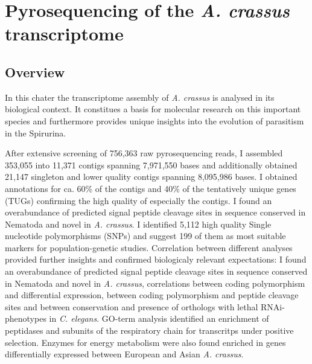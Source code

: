 
\chapter{Pyrosequencing of the \textit{A. crassus}
  transcriptome} %
\label{cha:pyro}



\ifpdf
    \graphicspath{{5_pyro/figures/PNG/}{5_pyro/figures/PDF/}{5_pyro/figures/}}
\else
    \graphicspath{{5_pyro/figures/EPS/}{5_pyro/figures/}}
\fi


\section{Overview}
\label{sec:454-overv}

In this chater the transcriptome assembly of \textit{A. crassus} is
analysed in its biological context. It constitues a basis for
molecular research on this important species and furthermore provides
unique insights into the evolution of parasitism in the Spirurina.

After extensive screening of 756,363 raw pyrosequencing reads, I
assembled 353,055 into 11,371 contigs spanning 7,971,550 bases and
additionally obtained 21,147 singleton and lower quality contigs
spanning 8,095,986 bases. I obtained annotations for ca. 60\% of the
contigs and 40\% of the tentatively unique genes (TUGs) confirming the
high quality of especially the contigs. I found an overabundance of
predicted signal peptide cleavage sites in sequence conserved in
Nematoda and novel in \textit{A. crassus}. I identified 5,112 high
quality Single nucleotide polymorphisms (SNPs) and suggest 199 of them
as most suitable markers for population-genetic studies. Correlation
between different analyses provided further insights and confirmed
biologicaly relevant expectations: I found an overabundance of
predicted signal peptide cleavage sites in sequence conserved in
Nematoda and novel in \textit{A. crassus}, correlations between coding
polymorphism and differential expression, between coding polymorphism
and peptide cleavage sites and between conservation and presence of
orthologs with lethal RNAi-phenotypes in \textit{C. elegans}. GO-term
analysis identified an enrichment of peptidases and subunits of the
respiratory chain for transcritps under positive selection. Enzymes
for energy metabolism were also found enriched in genes differentially
expressed between European and Asian \textit{A. crassus}.

